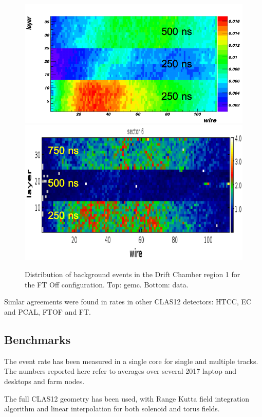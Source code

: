 \begin{figure}
	\centering
	\includegraphics[width=0.95\columnwidth,keepaspectratio]{img/ftOffGemcDCRates.png}
	\includegraphics[width=0.95\columnwidth,keepaspectratio]{img/ftOffDataDCRates.png}
	\caption{Distribution of background events in the Drift Chamber region 1 for the FT Off configuration.
             Top: gemc. Bottom: data.}
	\label{fig:ftOffComparison}
\end{figure}

Simlar agreements were found in rates in other CLAS12 detectors: HTCC, EC and PCAL, FTOF and FT.

\subsection{Benchmarks}

The event rate has been measured in a single core for single and multiple tracks. The numbers reported here
refer to averages over several 2017 laptop and desktops and farm nodes.

The full CLAS12 geometry has been used, with Range Kutta field integration algorithm
and linear interpolation for both solenoid and torus fields.

